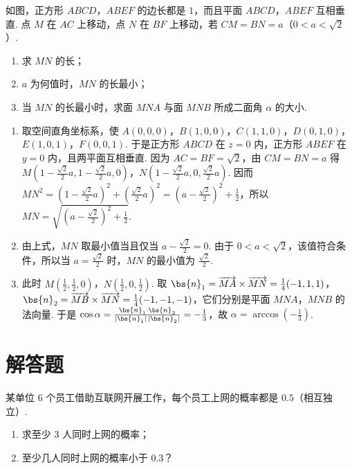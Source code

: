 \reuseproblemnumber
\begin{problem}[乙]
如图，正方形 \(ABCD\)，\(ABEF\) 的边长都是 \(1\)，而且平面 \(ABCD\)，\(ABEF\) 互相垂直. 点 \(M\) 在 \(AC\) 上移动，点 \(N\) 在 \(BF\) 上移动，若 \(CM = BN = a\)（\(0 < a < \sqrt{2}\)）.

\begin{enumerate}
\item 求 \(MN\) 的长；
\item \(a\) 为何值时，\(MN\) 的长最小；
\item 当 \(MN\) 的长最小时，求面 \(MNA\) 与面 \(MNB\) 所成二面角 \(\alpha\) 的大小.
\end{enumerate}

\FloatBarrier
\end{problem}

\begin{solution}
\begin{enumerate}
\item 取空间直角坐标系，使 \(A(0,0,0)\)，\(B(1,0,0)\)，\(C(1,1,0)\)，\(D(0,1,0)\)，\(E(1,0,1)\)，\(F(0,0,1)\). 于是正方形 \(ABCD\) 在 \(z=0\) 内，正方形 \(ABEF\) 在 \(y=0\) 内，且两平面互相垂直. 因为 \(AC=BF=\sqrt{2}\)，由 \(CM=BN=a\) 得
\(M\left(1-\frac{\sqrt{2}}{2}a,1-\frac{\sqrt{2}}{2}a,0\right)\)，\(N\left(1-\frac{\sqrt{2}}{2}a,0,\frac{\sqrt{2}}{2}a\right)\). 因而
\(MN^{2}=\left(1-\frac{\sqrt{2}}{2}a\right)^{2}+\left(\frac{\sqrt{2}}{2}a\right)^{2}=\left(a-\frac{\sqrt{2}}{2}\right)^{2}+\frac{1}{2}\)，所以 \(MN=\sqrt{\left(a-\frac{\sqrt{2}}{2}\right)^{2}+\frac{1}{2}}\).
\item 由上式，\(MN\) 取最小值当且仅当 \(a-\frac{\sqrt{2}}{2}=0\). 由于 \(0<a<\sqrt{2}\)，该值符合条件，所以当 \(a=\frac{\sqrt{2}}{2}\) 时，\(MN\) 的最小值为 \(\frac{\sqrt{2}}{2}\).
\item 此时 \(M\left(\frac{1}{2},\frac{1}{2},0\right)\)，\(N\left(\frac{1}{2},0,\frac{1}{2}\right)\). 取
\(\bs{n}_{1}=\overrightarrow{MA}\times\overrightarrow{MN}=\frac{1}{4}(-1,1,1)\)，\(\bs{n}_{2}=\overrightarrow{MB}\times\overrightarrow{MN}=\frac{1}{4}(-1,-1,-1)\)，它们分别是平面 \(MNA\)，\(MNB\) 的法向量. 于是
\(\cos\alpha=\frac{\bs{n}_{1}\cdot\bs{n}_{2}}{|\bs{n}_{1}|\,|\bs{n}_{2}|}=-\frac{1}{3}\)，故 \(\alpha=\arccos\left(-\frac{1}{3}\right)\).
\end{enumerate}
\end{solution}

\section{解答题}
\begin{problem}
某单位 \(6\text{ 个}\)员工借助互联网开展工作，每个员工上网的概率都是 \(0.5\)（相互独立）.

\begin{enumerate}
\item 求至少 \(3\text{ 人}\)同时上网的概率；
\item 至少几人同时上网的概率小于 \(0.3\)？
\end{enumerate}
\end{problem}

